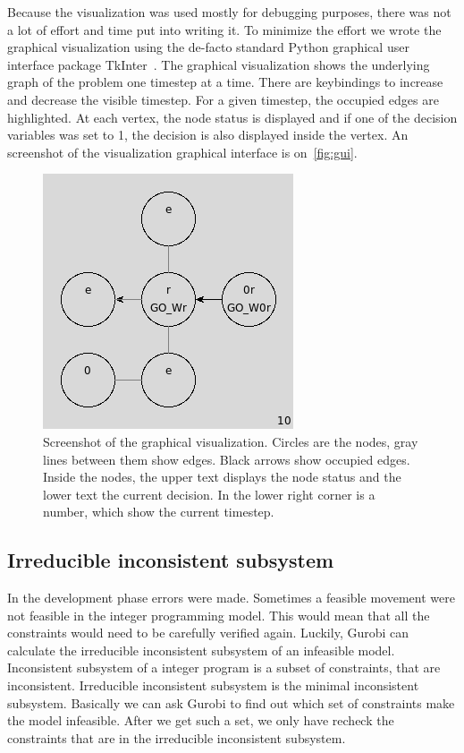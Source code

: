 Because the visualization was used mostly for debugging purposes, there was not
a lot of effort and time put into writing it. To minimize the effort we wrote
the graphical visualization using the de-facto standard Python graphical user
interface package TkInter~\cite{tkinter}. The graphical visualization shows the
underlying graph of the problem one timestep at a time. There are keybindings
to increase and decrease the visible timestep. For a given timestep, the
occupied edges are highlighted. At each vertex, the node status is displayed
and if one of the decision variables was set to 1, the decision is also displayed
inside the vertex. An screenshot of the visualization graphical interface is
on~\autoref{fig:gui}.

\begin{figure}[h]
    \begin{center}
	\includegraphics[scale=0.6]{fig/app/ex10.png}
        \caption{Screenshot of the graphical visualization. Circles are the
            nodes, gray lines between them show edges. Black arrows show
            occupied edges. Inside the nodes, the upper text displays the node
            status and the lower text the current decision. In the lower right
        corner is a number, which show the current timestep. }
        \label{fig:gui}
    \end{center}
\end{figure}

\subsection{Irreducible inconsistent subsystem}
In the development phase errors were made. Sometimes a feasible movement were
not feasible in the integer programming model. This would mean that all the
constraints would need to be carefully verified again. Luckily, Gurobi can
calculate the irreducible inconsistent subsystem of an infeasible model.
Inconsistent subsystem of a integer program is a subset of constraints, that
are inconsistent. Irreducible inconsistent subsystem is the minimal
inconsistent subsystem. Basically we can ask Gurobi to find out which set of
constraints make the model infeasible. After we get such a set, we only have
recheck the constraints that are in the irreducible inconsistent subsystem.

